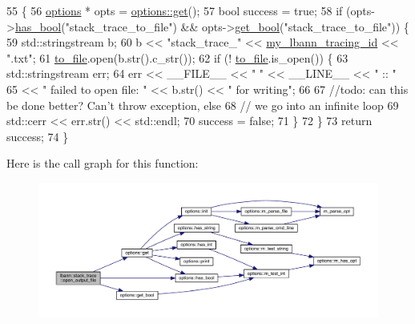 \begin{DoxyCode}
55                                \{
56   \hyperlink{classoptions}{options} * opts = \hyperlink{classoptions_a9ecfe9c365269df68a41b961c31ae3f5}{options::get}();
57   \textcolor{keywordtype}{bool} success = \textcolor{keyword}{true};
58   \textcolor{keywordflow}{if} (opts->\hyperlink{classoptions_aafb1d2a7ccde0b1bf786230ba4080ecd}{has\_bool}(\textcolor{stringliteral}{"stack\_trace\_to\_file"}) && opts->\hyperlink{classoptions_a99aa190102de33e2aed39723929f9fad}{get\_bool}(\textcolor{stringliteral}{"stack\_trace\_to\_file"})) \{
59     std::stringstream b;
60     b << \textcolor{stringliteral}{"stack\_trace\_"} << \hyperlink{namespacelbann_1_1stack__trace_a78efe186260936105751e65f56c381d7}{my\_lbann\_tracing\_id} << \textcolor{stringliteral}{".txt"};
61     \hyperlink{namespacelbann_1_1stack__trace_a6c838c74fec7cc57e5ccad283a8d282b}{to\_file}.open(b.str().c\_str());
62     \textcolor{keywordflow}{if} (! \hyperlink{namespacelbann_1_1stack__trace_a6c838c74fec7cc57e5ccad283a8d282b}{to\_file}.is\_open()) \{
63       std::stringstream err;
64       err << \_\_FILE\_\_ << \textcolor{stringliteral}{" "} << \_\_LINE\_\_ << \textcolor{stringliteral}{" :: "}
65           << \textcolor{stringliteral}{" failed to open file: "} << b.str() << \textcolor{stringliteral}{" for writing"};
66 
67       \textcolor{comment}{//todo: can this be done better? Can't throw exception, else}
68       \textcolor{comment}{//      we go into an infinite loop}
69       std::cerr << err.str() << std::endl;
70       success = \textcolor{keyword}{false};
71     \}
72   \}
73   \textcolor{keywordflow}{return} success;
74 \}
\end{DoxyCode}
Here is the call graph for this function\+:\nopagebreak
\begin{figure}[H]
\begin{center}
\leavevmode
\includegraphics[width=350pt]{namespacelbann_1_1stack__trace_aa071d75a81128e2a8100d66529482842_cgraph}
\end{center}
\end{figure}
